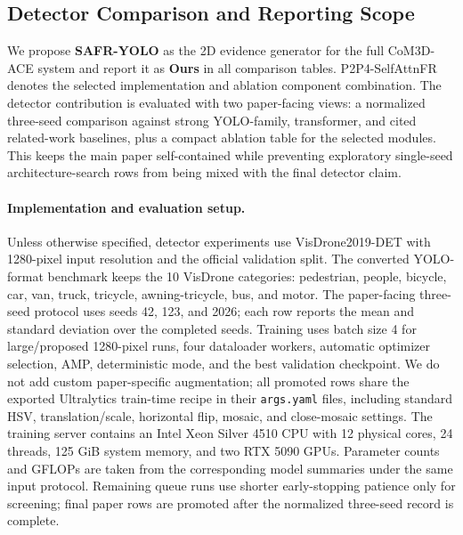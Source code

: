 \subsection{Detector Comparison and Reporting Scope}
\label{sec:detector_results_scope}

We propose \textbf{SAFR-YOLO} as the 2D evidence generator for the full
CoM3D-ACE system and report it as \textbf{Ours} in all comparison tables.
P2P4-SelfAttnFR denotes the selected implementation and ablation component
combination. The detector contribution is evaluated with two
paper-facing views: a normalized three-seed comparison against strong
YOLO-family, transformer, and cited related-work baselines, plus a compact
ablation table for the selected modules. This keeps the main paper
self-contained while preventing exploratory single-seed architecture-search
rows from being mixed with the final detector claim.

\paragraph{Implementation and evaluation setup.}
Unless otherwise specified, detector experiments use VisDrone2019-DET with
1280-pixel input resolution and the official validation split. The converted
YOLO-format benchmark keeps the 10 VisDrone categories: pedestrian, people,
bicycle, car, van, truck, tricycle, awning-tricycle, bus, and motor. The
paper-facing three-seed protocol uses seeds 42, 123, and 2026; each row reports
the mean and standard deviation over the completed seeds. Training uses batch
size 4 for large/proposed 1280-pixel runs, four dataloader workers, automatic
optimizer selection, AMP, deterministic mode, and the best validation
checkpoint. We do not add custom paper-specific augmentation; all promoted rows
share the exported Ultralytics train-time recipe in their \texttt{args.yaml}
files, including standard HSV, translation/scale, horizontal flip, mosaic, and
close-mosaic settings. The training server contains an Intel Xeon Silver 4510
CPU with 12 physical cores, 24 threads, 125 GiB system memory, and two RTX 5090
GPUs. Parameter counts and GFLOPs are taken from the corresponding model
summaries under the same input protocol. Remaining queue runs use shorter
early-stopping patience only for screening; final paper rows are promoted after
the normalized three-seed record is complete.

